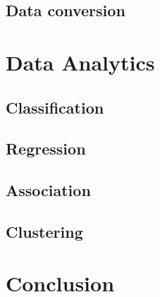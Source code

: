 \documentclass[12pt]{article}
\begin{document}
\subsection{Data conversion}
\section{Data Analytics}
\subsection{Classification}
\subsection{Regression}
\subsection{Association}
\subsection{Clustering}

\section{Conclusion}
\end{document}
